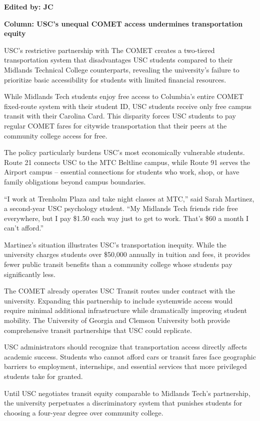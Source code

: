 \documentclass[12pt]{article}
\begin{document}
\begin{newversion}
\textbf{Edited by: JC}

\textbf{Column: USC's unequal COMET access undermines transportation equity}

USC's restrictive partnership with The COMET creates a two-tiered transportation system that disadvantages USC students compared to their Midlands Technical College counterparts, revealing the university's failure to prioritize basic accessibility for students with limited financial resources.

While Midlands Tech students enjoy free access to Columbia's entire COMET fixed-route system with their student ID, USC students receive only free campus transit with their Carolina Card. This disparity forces USC students to pay regular COMET fares for citywide transportation that their peers at the community college access for free.

The policy particularly burdens USC's most economically vulnerable students. Route 21 connects USC to the MTC Beltline campus, while Route 91 serves the Airport campus – essential connections for students who work, shop, or have family obligations beyond campus boundaries.

``I work at Trenholm Plaza and take night classes at MTC,'' said Sarah Martinez, a second-year USC psychology student. ``My Midlands Tech friends ride free everywhere, but I pay \$1.50 each way just to get to work. That's \$60 a month I can't afford.''

Martinez's situation illustrates USC's transportation inequity. While the university charges students over \$50,000 annually in tuition and fees, it provides fewer public transit benefits than a community college whose students pay significantly less.

The COMET already operates USC Transit routes under contract with the university. Expanding this partnership to include systemwide access would require minimal additional infrastructure while dramatically improving student mobility. The University of Georgia and Clemson University both provide comprehensive transit partnerships that USC could replicate.

USC administrators should recognize that transportation access directly affects academic success. Students who cannot afford cars or transit fares face geographic barriers to employment, internships, and essential services that more privileged students take for granted.

Until USC negotiates transit equity comparable to Midlands Tech's partnership, the university perpetuates a discriminatory system that punishes students for choosing a four-year degree over community college.
\end{newversion}
\end{document}
